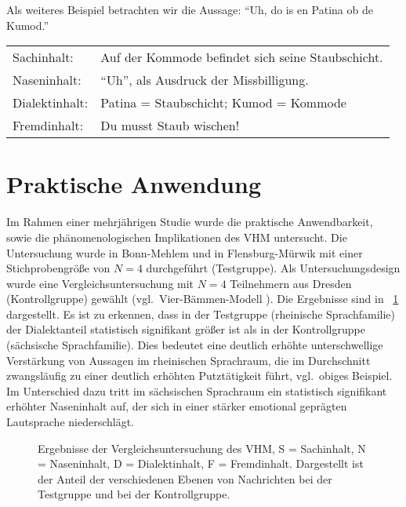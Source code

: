 \documentclass[11pt,DIV16,twocolumn]{scrartcl}
\begin{document}
%
Als weiteres Beispiel betrachten wir die Aussage: "`Uh, do is en
Patina ob de Kumod."'
%
\begin{center}
  \begin{tabularx}{\linewidth}{lX}
    Sachinhalt: & Auf der Kommode befindet sich seine Staubschicht. \\
    Naseninhalt: & "`Uh"', als Ausdruck der Missbilligung. \\
    Dialektinhalt: & Patina = Staubschicht; Kumod = Kommode \\
    Fremdinhalt: & Du musst Staub wischen!
  \end{tabularx}
\end{center}

\section{Praktische Anwendung}

Im Rahmen einer mehrjährigen Studie wurde die praktische
Anwendbarkeit, sowie die phänomenologischen Implikationen des VHM
untersucht.  Die Untersuchung wurde in Bonn-Mehlem und in
Flensburg-Mürwik mit einer Stichprobengröße von $N=4$ durchgeführt
(Testgruppe).  Als Untersuchungsdesign wurde eine
Vergleichsuntersuchung mit $N=4$ Teilnehmern aus Dresden
(Kontrollgruppe) gewählt (vgl.\ Vier-Bämmen-Modell \cite{VBM}).  Die
Ergebnisse sind in \figurename~\ref{fig:VHM} dargestellt.  Es ist zu
erkennen, dass in der Testgruppe (rheinische Sprachfamilie) der
Dialektanteil statistisch signifikant größer ist als in der
Kontrollgruppe (sächsische Sprachfamilie).  Dies bedeutet eine
deutlich erhöhte unterschwellige Verstärkung von Aussagen im
rheinischen Sprachraum, die im Durchschnitt zwangsläufig zu einer
deutlich erhöhten Putztätigkeit führt, vgl.\ obiges Beispiel.  Im
Unterschied dazu tritt im sächsischen Sprachraum ein statistisch
signifikant erhöhter Naseninhalt auf, der sich in einer stärker
emotional geprägten Lautsprache niederschlägt.

\begin{figure}[tb]
  \centering
  \caption{Ergebnisse der Vergleichsuntersuchung des VHM, S =
    Sachinhalt, N = Naseninhalt, D = Dialektinhalt, F = Fremdinhalt.
    Dargestellt ist der Anteil der verschiedenen Ebenen von
    Nachrichten bei der Testgruppe und bei der Kontrollgruppe.}
  \label{fig:VHM}
\end{figure}
\end{document}
